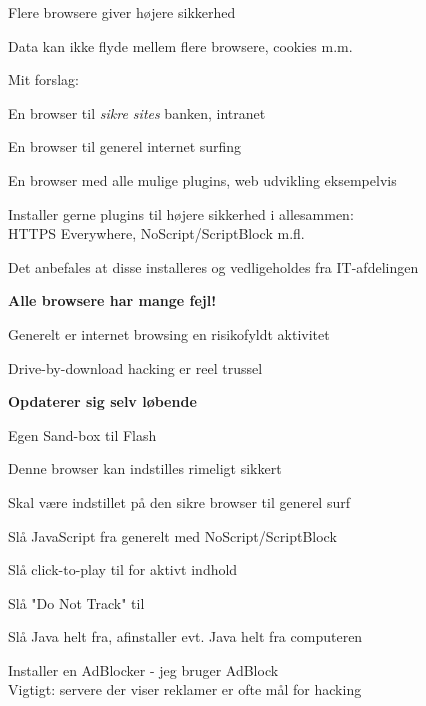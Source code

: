 \documentclass[20pt,landscape,a4paper]{foils}
\begin{document}



\begin{list1}
\item Flere browsere giver højere sikkerhed
\item Data kan ikke flyde mellem flere browsere, cookies m.m.
\item Mit forslag:
\begin{list2}
\item En browser til \emph{sikre sites} banken, intranet
\item En browser til generel internet surfing
\item En browser med alle mulige plugins, web udvikling eksempelvis
\end{list2}
\item Installer gerne plugins til højere sikkerhed i allesammen:\\
HTTPS Everywhere, NoScript/ScriptBlock m.fl.

\end{list1}

\vskip 1cm
\centerline{Det anbefales at disse installeres og vedligeholdes fra IT-afdelingen}


\vskip 1cm
\centerline{\bf\Large Alle browsere har mange fejl!}




\begin{list1}
\item Generelt er internet browsing en risikofyldt aktivitet
\item Drive-by-download hacking er reel trussel
\item {\bf Opdaterer sig selv løbende}
\item Egen Sand-box til Flash
\item Denne browser kan indstilles rimeligt sikkert
\end{list1}



\begin{list1}
\item Skal være indstillet på den sikre browser til generel surf
\begin{list2}
\item Slå JavaScript fra generelt med NoScript/ScriptBlock
\item Slå click-to-play til for aktivt indhold
\item Slå "Do Not Track" til
\item Slå Java helt fra, afinstaller evt. Java helt fra computeren
\item Installer en AdBlocker - jeg bruger AdBlock\\
Vigtigt: servere der viser reklamer er ofte mål for hacking
\end{list2}
\end{list1}
\end{document}
